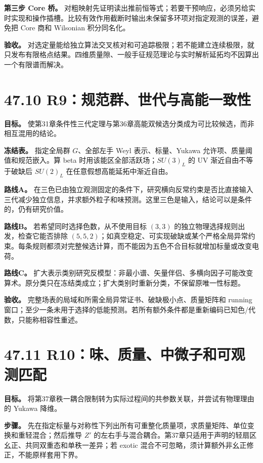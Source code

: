 \documentclass[
  11pt,
  oneside]{book}
\begin{document}
\textbf{第三步 Core 桥。}
对粗映射先证明读出推前恒等式；若要干预响应，必须另给实时实现和操作插槽。比较有效作用截断时输出未保留多环项对指定观测的误差，避免把
Core 商和 Wilsonian 积分同名化。

\textbf{验收。}
对选定量能给独立算法交叉核对和可追踪极限；若不能建立连续极限，就只发布有限格点结果。四维质量隙、一般手征规范理论与实时解析延拓均不因算出一个有限谱而解决。

\section{47.10 R9：规范群、世代与高能一致性}

\textbf{目标。}
使第31章条件性三代定理与第36章高能双候选分类成为可比较候选，而非相互混用的结论。

\textbf{冻结表。} 指定全局群 \(G\)、全部左手 Weyl 表示、标量、Yukawa
允许项、质量阈值和规范嵌入。算 beta 时用该能区全部活跃场；\(SU(3)_L\) 的
UV 渐近自由不等于破缺后 \(SU(2)_L\) 在任意假想高能延拓中渐近自由。

\textbf{路线A。}
在三色已由独立观测固定的条件下，研究横向反常约束是否比直接输入三代减少独立信息，并求额外粒子和味预测。这里三色是输入，结论可以是条件的，仍有研究价值。

\textbf{路线B。} 若希望同时选择色数，从不使用目标 \((3,3)\)
的独立物理选择规则出发，检查它能否排除
\((5,5,2)\)；如真空稳定、可实现破缺或某个严格全局异常约束。每条规则都须对完整候选计算，而不能因为五色不合目标就增加标量或改变电荷。

\textbf{路线C。}
扩大表示类别研究反模型：非最小谱、矢量伴侣、多横向因子可能改变算术。原分类只在冻结类成立；扩大类别时重新分类，不保留原唯一性标题。

\textbf{验收。} 完整场表的局域和所需全局异常证书、破缺极小点、质量矩阵和
running
窗口；至少一条未用于选择的低能预测。若所有额外条件都是重新编码已知色/代数，只能称相容性重述。

\section{47.11 R10：味、质量、中微子和可观测匹配}

\textbf{目标。}
将第37章秩一耦合限制转为实际过程间的共参数关联，并尝试有物理理由的
Yukawa 降维。

\textbf{步骤。}
先在指定标量与对称性下列出所有可重整化质量项，求质量矩阵、单位变换和重轻混合；然后推导
\(Z'\)
的左右手与混合耦合。第37章只适用于声明的轻扇区幺正、共同双重态和单秩一差异；若
exotic 混合不可忽略，须计算额外非幺正修正，不能原样套用下界。
\end{document}
